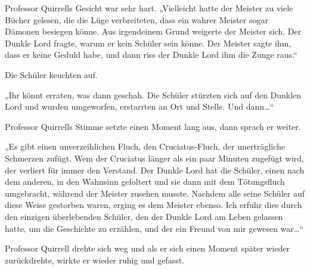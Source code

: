 Professor Quirrells Gesicht war sehr hart. „Vielleicht hatte der Meister zu viele Bücher gelesen, die die Lüge verbreiteten, dass ein wahrer Meister sogar Dämonen besiegen könne. Aus irgendeinem Grund weigerte der Meister sich. Der Dunkle Lord fragte, warum er kein Schüler sein könne. Der Meister sagte ihm, dass er keine Geduld habe, und dann riss der Dunkle Lord ihm die Zunge raus.“

Die Schüler keuchten auf.

„Ihr könnt erraten, was dann geschah. Die Schüler stürzten sich auf den Dunklen Lord und wurden umgeworfen, erstarrten an Ort und Stelle. Und dann…“

Professor Quirrells Stimme setzte einen Moment lang aus, dann sprach er weiter.

„Es gibt einen unverzeihlichen Fluch, den Cruciatus-Fluch, der unerträgliche Schmerzen zufügt. Wem der Cruciatus länger als ein paar Minuten zugefügt wird, der verliert für immer den Verstand. Der Dunkle Lord hat die Schüler, einen nach dem anderen, in den Wahnsinn gefoltert und sie dann mit dem Tötungsfluch umgebracht, während der Meister zusehen musste. Nachdem alle seine Schüler auf diese Weise gestorben waren, erging es dem Meister ebenso. Ich erfuhr dies durch den einzigen überlebenden Schüler, den der Dunkle Lord am Leben gelassen hatte, um die Geschichte zu erzählen, und der ein Freund von mir gewesen war…“

Professor Quirrell drehte sich weg und als er sich einen Moment später wieder zurückdrehte, wirkte er wieder ruhig und gefasst.

